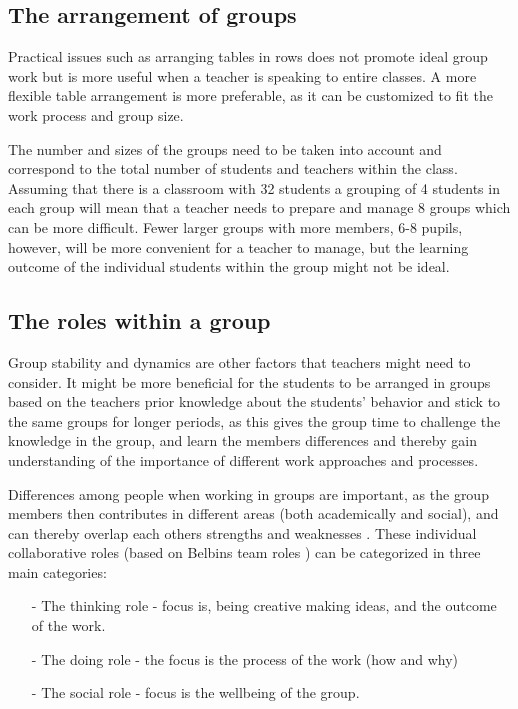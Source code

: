 \subsection{The arrangement of groups}\label{GroupArrangement}
Practical issues such as arranging tables in rows does not promote ideal group work but is more useful when a teacher is speaking to entire classes\cite{collaborationSocialPedagogy}. A more flexible table arrangement is more preferable, as it can be customized to fit the work process and group size\cite{collaborationSocialPedagogy}. 

The number and sizes of the groups need to be taken into account and correspond to the total number of students and teachers within the class. Assuming that there is a classroom with 32 students a grouping of 4 students in each group will mean that a teacher needs to prepare and manage 8 groups which can be more difficult. Fewer larger groups with more members, 6-8 pupils, however, will be more convenient for a teacher to manage, but the learning outcome of the individual students within the group might not be ideal\cite{collaborationSocialPedagogy}.\\


\subsection{The roles within a group}
Group stability and dynamics are other factors that teachers might need to consider. It might be more beneficial for the students to be arranged in groups based on the teachers prior knowledge about the students' behavior and stick to the same groups for longer periods\cite{collaborationSocialPedagogy}, as this gives the group time to challenge the knowledge in the group, and learn the members differences and thereby gain understanding of the importance of different work approaches and processes\cite{laeringIPraksis}.

Differences among people when working in groups are important, as the group members then contributes in different areas (both academically and social), and can thereby overlap each others strengths and weaknesses \cite{ProjektarbejdesKompleksitet}. These individual collaborative roles (based on Belbins team roles \cite{ProjektarbejdesKompleksitet}) can be categorized in three main categories: 
\begin{itemize}
	\item[-] The thinking role - focus is, being creative making ideas, and the outcome of the work. 
	\item[-] The doing role - the focus is the process of the work (how and why)
	\item[-] The social role - focus is the wellbeing of the group. 
\end{itemize}

